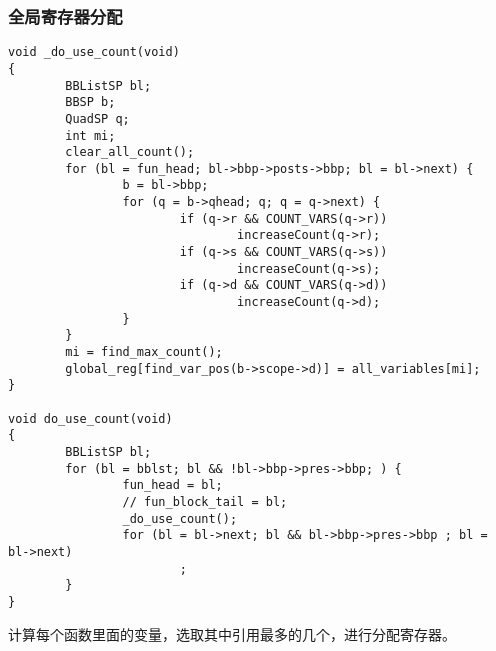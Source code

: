 \subsubsection{全局寄存器分配}
\begin{verbatim}
void _do_use_count(void)
{
        BBListSP bl;
        BBSP b;
        QuadSP q;
        int mi;
        clear_all_count();
        for (bl = fun_head; bl->bbp->posts->bbp; bl = bl->next) {
                b = bl->bbp;
                for (q = b->qhead; q; q = q->next) {
                        if (q->r && COUNT_VARS(q->r)) 
                                increaseCount(q->r);
                        if (q->s && COUNT_VARS(q->s)) 
                                increaseCount(q->s);
                        if (q->d && COUNT_VARS(q->d)) 
                                increaseCount(q->d);
                }
        }
        mi = find_max_count();
        global_reg[find_var_pos(b->scope->d)] = all_variables[mi];  
}

void do_use_count(void)
{
        BBListSP bl;
        for (bl = bblst; bl && !bl->bbp->pres->bbp; ) {
                fun_head = bl;
                // fun_block_tail = bl;
                _do_use_count();
                for (bl = bl->next; bl && bl->bbp->pres->bbp ; bl = bl->next) 
                        ;
        }
}
\end{verbatim}
计算每个函数里面的变量，选取其中引用最多的几个，进行分配寄存器。

